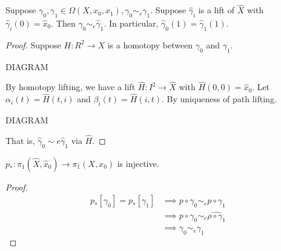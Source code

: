\documentclass[a4paper, 10pt, twocolumn]{amsart}
\begin{document}
\begin{proposition}Suppose $\gamma_0, \gamma_1 \in \Omega\left(X, x_0, x_1\right), \gamma_0 \sim_e \gamma_1$. Suppose $\hat{\gamma}_i$ is a lift of $\hat{X}$ with $\hat{\gamma}_i(0)=\hat{x}_0$. Then $\hat{\gamma}_0 \sim_e \hat{\gamma}_1$. In particular, $\hat{\gamma}_0(1)=\hat{\gamma}_1(1)$.
\end{proposition}
\begin{proof}
  Suppose $H: R^2 \rightarrow X$ is a homotopy between $\gamma_0$ and $\gamma_1$.

  {\color{red} DIAGRAM}

  By homotopy lifting, we have a lift $\hat{H}: I^2 \rightarrow \hat{X}$ with $\hat{H}(0,0)=\hat{x}_0$. Let $\alpha_i(t)=\hat{H}(t, i)$ and $\beta_i(t)=\hat{H}(i, t)$. By uniqueness of path lifting.

  {\color{red} DIAGRAM}

  That is, $\hat{\gamma}_0 \sim e \hat{\gamma}_1$ via $\hat{H}$.
\end{proof}

\begin{corollary}
  $p_*: \pi_1(\hat{X}, \hat{x}_0) \rightarrow \pi_1(X, x_0)$ is injective.
\end{corollary}
\begin{proof}
  $$
\begin{aligned}
p_*\left[\gamma_0\right]=p_*\left[\gamma_1\right] & \implies p \circ \gamma_0 \sim_e p \circ \gamma_1 \\
& \implies p \circ \gamma_0 \sim_e \widehat{\rho \circ \gamma_1} \\
& \implies \gamma_0 \sim_e \gamma_1
\end{aligned}
$$
\end{proof}
\end{document}
